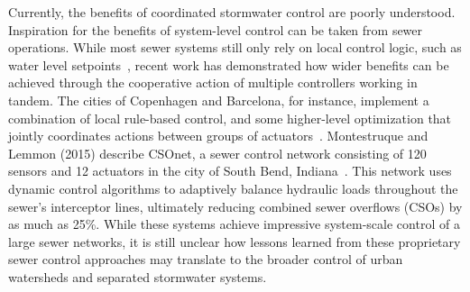 Currently, the benefits of coordinated stormwater control are poorly understood. Inspiration for the benefits of system-level control can be taken from sewer operations. While most sewer systems still only rely on local control logic, such as water level setpoints~\cite{Schutze2004RealToday}, recent work has demonstrated how wider benefits can be achieved through the cooperative action of multiple controllers working in tandem. The cities of Copenhagen and Barcelona, for instance, implement a combination of local rule-based control, and some higher-level optimization that jointly coordinates actions between groups of actuators~\cite{Mollerup2016}. Montestruque and Lemmon (2015) describe CSOnet, a sewer control network consisting of 120 sensors and 12 actuators in the city of South Bend, Indiana~\cite{Montestruque_2015}. This network uses dynamic control algorithms to adaptively balance hydraulic loads throughout the sewer’s interceptor lines, ultimately reducing combined sewer overflows (CSOs) by as much as 25\%. While these systems achieve impressive system-scale control of a large sewer networks, it is still unclear how lessons learned from these proprietary sewer control approaches may translate to the broader control of urban watersheds and separated stormwater systems. 

\

